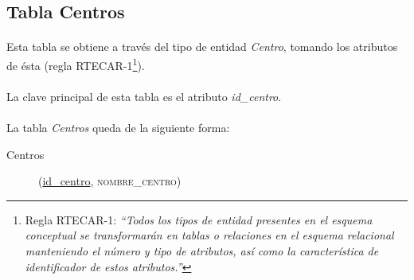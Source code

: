    \subsection{Tabla Centros}

      \paragraph{}Esta tabla se obtiene a través del tipo de entidad
      \textit{Centro}, tomando los atributos de ésta (regla RTECAR-1\footnote{Regla
      RTECAR-1: \textit{``Todos los tipos de entidad
      presentes en el esquema conceptual se transformarán en tablas o relaciones
      en el esquema relacional manteniendo el número y tipo de atributos, así
      como la característica de identificador de estos atributos.''}}).

      \paragraph{}La clave principal de esta tabla es el atributo
      \textit{id\_centro}.

      \paragraph{}La tabla \textit{Centros} queda de la siguiente forma:

      \begin{description}
         \item[Centros] \begin{flushleft}(\underline{id\_centro},
         \textsc{nombre\_centro})\end{flushleft}
      \end{description}